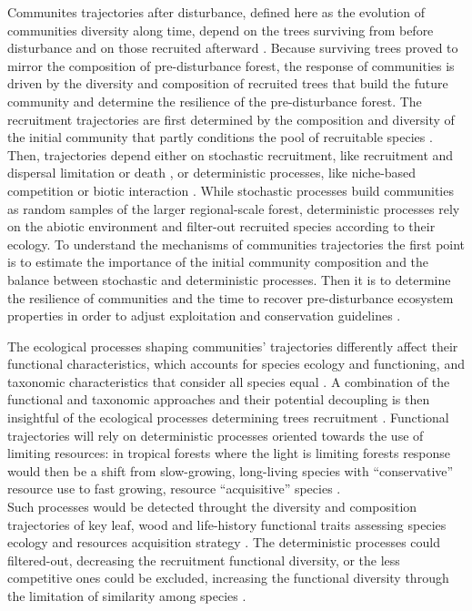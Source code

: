 \documentclass[fleqn,10pt]{ArtEcoFoG} %
\begin{document}
Communites trajectories after disturbance, defined here as the evolution
of communities diversity along time, depend on the trees surviving from
before disturbance and on those recruited afterward \citep{Herault2018}.
Because surviving trees proved to mirror the composition of
pre-disturbance forest, the response of communities is driven by the
diversity and composition of recruited trees that build the future
community and determine the resilience of the pre-disturbance forest.
The recruitment trajectories are first determined by the composition and
diversity of the initial community that partly conditions the pool of
recruitable species \citep{Herault2018}. Then, trajectories depend
either on stochastic recruitment, like recruitment and dispersal
limitation or death \citep{Hurtt1995, Hubbell2001}, or deterministic
processes, like niche-based competition or biotic interaction
\citep{Adler2007}. While stochastic processes build communities as
random samples of the larger regional-scale forest, deterministic
processes rely on the abiotic environment and filter-out recruited
species according to their ecology. To understand the mechanisms of
communities trajectories the first point is to estimate the importance
of the initial community composition and the balance between stochastic
and deterministic processes. Then it is to determine the resilience of
communities and the time to recover pre-disturbance ecosystem properties
in order to adjust exploitation and conservation guidelines
\citep{Diaz2005, Gardner2007, Schwartz2017}.

The ecological processes shaping communities' trajectories differently
affect their functional characteristics, which accounts for species
ecology and functioning, and taxonomic characteristics that consider all
species equal \citep{Violle2007b, Kunstler2016}. A combination of the
functional and taxonomic approaches and their potential decoupling is
then insightful of the ecological processes determining trees
recruitment \citep{Fukami2005}. Functional trajectories will rely on
deterministic processes oriented towards the use of limiting resources:
in tropical forests where the light is limiting forests response would
then be a shift from slow-growing, long-living species with
``conservative'' resource use to fast growing, resource ``acquisitive''
species \citep{Denslow1980, Molino2001, Bongers2009}.\\
Such processes would be detected throught the diversity and composition
trajectories of key leaf, wood and life-history functional traits
assessing species ecology and resources acquisition strategy
\citep{Wright2004, Chave2009b, Herault2011}. The deterministic processes
could filtered-out, decreasing the recruitment functional diversity, or
the less competitive ones could be excluded, increasing the functional
diversity through the limitation of similarity among species
\citep{Ackerly2003, McGill2006}.
\end{document}
